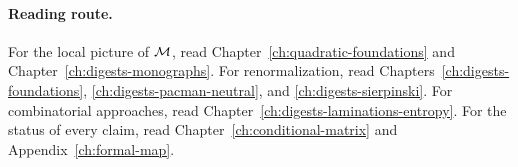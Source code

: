 \paragraph{Reading route.}
For the local picture of $\mathcal M$, read Chapter~\ref{ch:quadratic-foundations} and Chapter~\ref{ch:digests-monographs}.  For renormalization,
read Chapters~\ref{ch:digests-foundations}, \ref{ch:digests-pacman-neutral}, and \ref{ch:digests-sierpinski}.  For combinatorial
approaches, read Chapter~\ref{ch:digests-laminations-entropy}.  For the status of every claim, read Chapter~\ref{ch:conditional-matrix}
and Appendix~\ref{ch:formal-map}.
